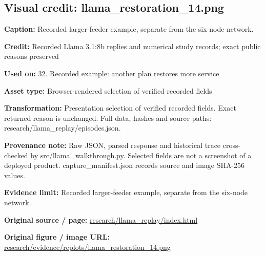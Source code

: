\documentclass[10pt,letterpaper]{article}
\begin{document}
\subsection*{Visual credit: llama\_restoration\_14.png}
\textbf{Caption:} Recorded larger-feeder example, separate from the six-node network.\par
\textbf{Credit:} Recorded Llama 3.1:8b replies and numerical study records; exact public reasons preserved\par
\textbf{Used on:} 32. Recorded example: another plan restores more service\par
\textbf{Asset type:} Browser-rendered selection of verified recorded fields\par
\textbf{Transformation:} Presentation selection of verified recorded fields. Exact returned reason is unchanged. Full data, hashes and source paths: research/llama\_replay/episodes.json.\par
\textbf{Provenance note:} Raw JSON, parsed response and historical trace cross-checked by src/llama\_walkthrough.py. Selected fields are not a screenshot of a deployed product. capture\_manifest.json records source and image SHA-256 values.\par
\textbf{Evidence limit:} Recorded larger-feeder example, separate from the six-node network.\par
\textbf{Original source / page:} \href{../research/llama_replay/index.html}{\small\ttfamily research/\allowbreak{}llama\_\allowbreak{}replay/\allowbreak{}index.\allowbreak{}html}\par
\textbf{Original figure / image URL:} \href{../research/evidence/replots/llama_restoration_14.png}{\small\ttfamily research/\allowbreak{}evidence/\allowbreak{}replots/\allowbreak{}llama\_\allowbreak{}restoration\_\allowbreak{}14.\allowbreak{}png}\par
\par\medskip
\end{document}
